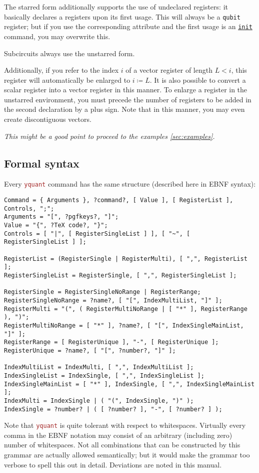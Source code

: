 \documentclass{scrartcl}
\def\pkg#1{\textcolor{brown}{\texttt{#1}}}
\def\gate#1{\hyperref[gate:#1]{\texttt{#1}}}
\def\Yquant{\pkg{yquant}}
\begin{document}
         The starred form additionally supports the use of undeclared registers: it basically declares a registers upon its first usage.
         This will always be a \texttt{qubit} register; but if you use the corresponding attribute and the first usage is an \gate{init} command, you may overwrite this.

         Subcircuits always use the unstarred form.

         Additionally, if you refer to the index $i$ of a vector register of length $L < i$, this register will automatically be enlarged to $i \coloneq L$.
         It is also possible to convert a scalar register into a vector register in this manner.
         To enlarge a register in the unstarred environment, you must precede the number of registers to be added in the second declaration by a plus sign.
         Note that in this manner, you may even create discontiguous vectors.

         \emph{This might be a good point to proceed to the examples \cref{sec:examples}.}

      \subsection[Formal syntax]{Formal syntax}
         Every \Yquant{} command has the same structure (described here in EBNF syntax):
         \begin{verbatim}
Command = { Arguments }, ?command?, [ Value ], [ RegisterList ], Controls, ";";
Arguments = "[", ?pgfkeys?, "]";
Value = "{", ?TeX code?, "}";
Controls = [ "|", [ RegisterSingleList ] ], [ "~", [ RegisterSingleList ] ];

RegisterList = (RegisterSingle | RegisterMulti), [ ",", RegisterList ];
RegisterSingleList = RegisterSingle, [ ",", RegisterSingleList ];

RegisterSingle = RegisterSingleNoRange | RegisterRange;
RegisterSingleNoRange = ?name?, [ "[", IndexMultiList, "]" ];
RegisterMulti = "(", ( RegisterMultiNoRange | [ "*" ], RegisterRange ), ")";
RegisterMultiNoRange = [ "*" ], ?name?, [ "[", IndexSingleMainList, "]" ];
RegisterRange = [ RegisterUnique ], "-", [ RegisterUnique ];
RegisterUnique = ?name?, [ "[", ?number?, "]" ];

IndexMultiList = IndexMulti, [ ",", IndexMultiList ];
IndexSingleList = IndexSingle, [ ",", IndexSingleList ];
IndexSingleMainList = [ "*" ], IndexSingle, [ ",", IndexSingleMainList ];
IndexMulti = IndexSingle | ( "(", IndexSingle, ")" );
IndexSingle = ?number? | ( [ ?number? ], "-", [ ?number? ] );
         \end{verbatim}
         Note that \Yquant{} is quite tolerant with respect to whitespaces.
         Virtually every comma in the EBNF notation may consist of an arbitrary (including zero) number of whitespaces.
         Not all combinations that can be constructed by this grammar are actually allowed semantically; but it would make the grammar too verbose to spell this out in detail.
         Deviations are noted in this manual.
\end{document}
